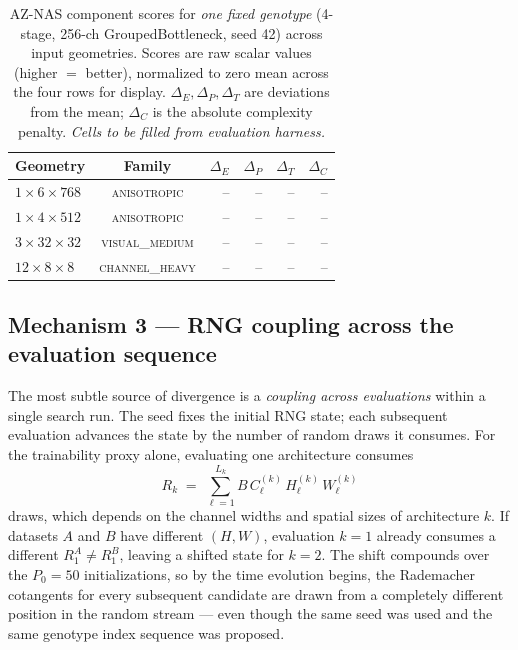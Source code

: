 \documentclass[10pt,twocolumn]{article}
\newcommand{\family}[1]{\textsc{#1}}
\begin{document}
\begin{table}[t]
\centering
\caption{AZ-NAS component scores for \emph{one fixed genotype} (4-stage,
256-ch GroupedBottleneck, seed 42) across input geometries. Scores are raw
scalar values (higher $=$ better), normalized to zero mean across the four
rows for display. $\Delta_E, \Delta_P, \Delta_T$ are deviations from the
mean; $\Delta_C$ is the absolute complexity penalty.
\emph{Cells to be filled from evaluation harness.}}
\label{tab:proxy-shift}
\footnotesize
\begin{tabular}{@{}lcrrrr@{}}
\toprule
Geometry & Family & $\Delta_E$ & $\Delta_P$ & $\Delta_T$ & $\Delta_C$\\
\midrule
$1\!\times\!6\!\times\!768$   & \family{anisotropic}   & -- & -- & -- & --\\
$1\!\times\!4\!\times\!512$   & \family{anisotropic}   & -- & -- & -- & --\\
$3\!\times\!32\!\times\!32$   & \family{visual\_medium} & -- & -- & -- & --\\
$12\!\times\!8\!\times\!8$    & \family{channel\_heavy} & -- & -- & -- & --\\
\bottomrule
\end{tabular}
\end{table}

\subsection{Mechanism 3 --- RNG coupling across the evaluation sequence}
The most subtle source of divergence is a \emph{coupling across evaluations}
within a single search run.  The seed fixes the initial RNG state; each
subsequent evaluation advances the state by the number of random draws it
consumes.  For the trainability proxy alone, evaluating one architecture
consumes
\begin{equation}
R_k \;=\; \sum_{\ell=1}^{L_k} B\,C_{\ell}^{(k)}\,H_{\ell}^{(k)}\,W_{\ell}^{(k)}
\end{equation}
draws, which depends on the channel widths and spatial sizes of architecture
$k$.  If datasets $A$ and $B$ have different $(H,W)$, evaluation $k=1$ already
consumes a different $R_1^A \ne R_1^B$, leaving a shifted state for $k=2$.
The shift compounds over the $P_0 = 50$ initializations, so by the time
evolution begins, the Rademacher cotangents for every subsequent candidate are
drawn from a completely different position in the random stream --- even though
the same seed was used and the same genotype index sequence was proposed.
\end{document}
